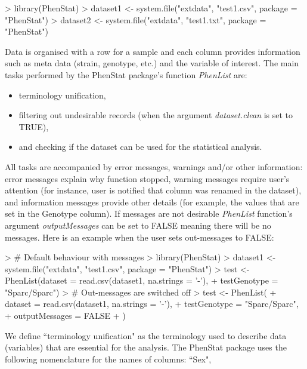 \documentclass[a4paper]{article}
\begin{document}
\begin{Schunk}
\begin{Sinput}
> library(PhenStat)
> dataset1 <- system.file("extdata", "test1.csv", package = "PhenStat")
> dataset2 <- system.file("extdata", "test1.txt", package = "PhenStat")
\end{Sinput}
\end{Schunk}
Data is organised with a row for a sample and each column provides information such as meta data
(strain, genotype, etc.) and the variable of interest.
\newline
The main tasks performed by the PhenStat package's function \textit{PhenList} are:
\begin{itemize}
\item terminology unification,
\item filtering out undesirable records (when the argument \textit{dataset.clean} is set to TRUE),
\item and checking if the dataset can be used for the statistical analysis.
\end{itemize}
All tasks are accompanied by error messages, warnings and/or other information: error messages explain
why function stopped,
warning messages require user's attention (for instance, user is notified that column was renamed in the dataset),
and information messages provide other details (for example, the values that are set in the Genotype column).
If messages are not desirable \textit{PhenList} function's argument \textit{outputMessages} can be set to FALSE
meaning there will be no messages.
\newline\newline
Here is an example when the user sets out-messages to FALSE:
\begin{Schunk}
\begin{Sinput}
> # Default behaviour with messages
> library(PhenStat)
> dataset1 <- system.file("extdata", "test1.csv", package = "PhenStat")
> test <- PhenList(dataset = read.csv(dataset1, na.strings = '-'),
+                  testGenotype = "Sparc/Sparc")
> # Out-messages are switched off
> test <- PhenList(
+   dataset = read.csv(dataset1, na.strings = '-'),
+   testGenotype = "Sparc/Sparc",
+   outputMessages = FALSE
+ )
\end{Sinput}
\end{Schunk}
We define ``terminology unification" as the terminology used to describe data (variables) that are essential
for the analysis. The PhenStat package uses the following nomenclature for the names of columns: ``Sex",
\end{document}
